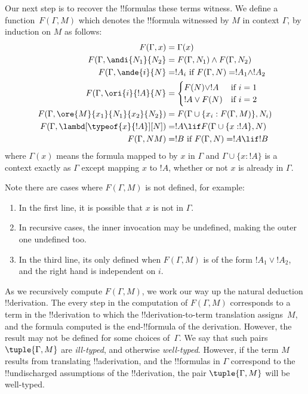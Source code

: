 \documentclass[../../../include/open-logic-section]{subfiles}
\begin{document}
Our next step is to recover the !!{formula}s these terms witness. We
define a function~$F(\Gamma,M)$ which denotes the !!{formula}
witnessed by $M$ in context $\Gamma$, by induction on $M$ as follows:
\begin{align*}
  F(\Gamma, x) &= \Gamma(x) \\
  F(\Gamma, \andi{N_1}{N_2} & = F(\Gamma, N_1) \land F(\Gamma, N_2)\\
  F(\Gamma, \ande{i}{N} & = !A_i \text{ if } F(\Gamma, N) = !A_1 \land !A_2\\
  F(\Gamma, \ori{i}{!A}{N} & = \begin{cases} F(N) \lor !A & \text{if } i = 1\\
    !A \lor F(N) & \text{if } i = 2\end{cases}\\
  F(\Gamma, \ore{M}{x_1}{N_1}{x_2}{N_2}) &= F(\Gamma \cup
  \{x_i:F(\Gamma, M)\}, N_i) \\
  F(\Gamma, \lambd[\typeof{x}{!A}][N]) &= !A \lif F(\Gamma \cup
  \{x:!A\}, N) \\
  F(\Gamma, NM) & = !B \text{ if } F(\Gamma, N) = !A \lif !B
\end{align*}
where $\Gamma(x)$ means the formula mapped to by $x$ in $\Gamma$
and $\Gamma \cup \{x:!A\}$
is a context exactly as $\Gamma$ except mapping $x$ to $!A$,
whether or not $x$ is already in $\Gamma$.

Note there are cases where $F(\Gamma, M)$ is not defined, for example:
\begin{enumerate}
\item In the first line, it is possible that $x$ is not in $\Gamma$.
\item In recursive cases, the inner invocation may be undefined, making
  the outer one undefined too.
\item In the third line, its only defined when $F(\Gamma, M)$ is of
  the form $!A_1 \lor !A_2$, and the right hand is independent on $i$.
\end{enumerate}

As we recursively compute $F(\Gamma, M)$, we work our way up the
natural deduction !!{derivation}. The every step in the computation of
$F(\Gamma, M)$ corresponds to a term in the !!{derivation} to which
the !!{derivation}-to-term translation assigns~$M$, and the formula
computed is the end-!!{formula} of the derivation. However, the result
may not be defined for some choices of~$\Gamma$. We say that such
pairs $\tuple{\Gamma, M}$ are \emph{ill-typed}, and otherwise
\emph{well-typed}. However, if the term $M$ results from translating
!!a{derivation}, and the !!{formula}s in $\Gamma$ correspond to the
!!{undischarged} assumptions of the !!{derivation}, the pair
$\tuple{\Gamma, M}$ will be well-typed.
\end{document}
